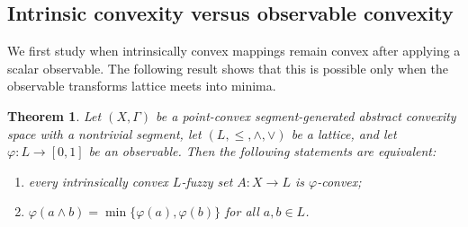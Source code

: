 \documentclass[11pt,a4paper]{article}
\newtheorem{theorem}{Theorem}
\begin{document}
\subsection{Intrinsic convexity versus observable convexity}

\smallskip

We first study when intrinsically convex mappings remain convex after applying a scalar observable. The following result shows that this is possible only when the observable transforms lattice meets into minima.


\begin{theorem}\label{teo_sharp_observable}
Let \((X,\Gamma)\) be a point-convex segment-generated abstract convexity space with a nontrivial segment, let \((L,\leq,\wedge,\vee)\) be a lattice, and let \(\varphi:L\to[0,1]\) be an observable. Then the following statements are equivalent:
\begin{enumerate}
    \item every intrinsically convex \(L\)-fuzzy set \(A:X\to L\) is \(\varphi\)-convex;
    \item \(\varphi(a\wedge b)=\min\{\varphi(a),\varphi(b)\}\) for all \(a,b\in L\).
\end{enumerate}
\end{theorem}
\end{document}
